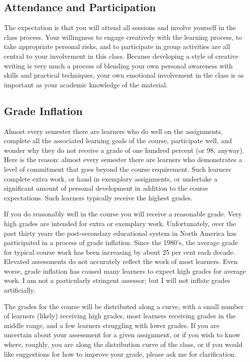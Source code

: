 \documentclass[10pt,DIV09,letterpaper,oneside,headsepline]{scrreprt}
\begin{document}
\subsection{Attendance and Participation}
The expectation is that you will attend all sessions and involve
yourself in the class process. Your willingness to engage creatively
with the learning process, to take appropriate personal risks, and to
participate in group activities are all central to your involvement in
this class. Because developing a style of creative writing is very
much a process of blending your own personal awareness with skills and
practical techniques, your own emotional involvement in the class is
as important as your academic knowledge of the material.

\subsection{Grade Inflation}
Almost every semester there are learners who do well on the
assignments, complete all the associated learning goals of the course,
participate well, and wonder why they do not receive a grade of one
hundred percent (or 98, anyway). Here is the reason: almost every
semester there are learners who demonstrates a level of commitment
that goes beyond the course requirement. Such learners complete extra
work, or hand in exemplary assignments, or undertake a significant
amount of personal development in addition to the course expectations.
Such learners typically receive the highest grades.

If you do reasonably well in the course you will receive a reasonable
grade. Very high grades are intended for extra or exemplary work.
Unfortunately, over the past thirty years the post-secondary
educational system in North America has participated in a process of
grade inflation. Since the 1980's, the average grade for typical
course work has been increasing by about 25 per cent each decade.
Elevated assessments do not accurately reflect the work of most
learners. Even worse, grade inflation has caused many learners to
expect high grades for average work. I am not a particularly stringent
assessor; but I will not inflate grades artificially.

The grades for the course will be distributed along a curve, with a
small number of learners (likely) receiving high grades, most learners
receiving grades in the middle range, and a few learners struggling
with lower grades. If you are uncertain about your assessment for a
given assignment, or if you wish to know where, roughly, you are along
the distribution curve of the class, or if you would like suggestions
for how to improve your grade, please ask me for clarification.
\end{document}
